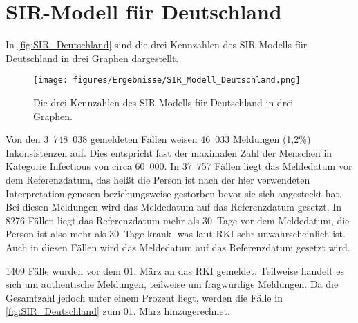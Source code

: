 \section{SIR-Modell für Deutschland}\label{sec:Resultate-SIR}
In \autoref{fig:SIR_Deutschland} sind die drei Kennzahlen des SIR-Modells für Deutschland in drei Graphen dargestellt.
\begin{figure}[H]
    \centering
    \texttt{[image: figures/Ergebnisse/SIR\_Modell\_Deutschland.png]}
    \caption{Die drei Kennzahlen des SIR-Modells für Deutschland in drei Graphen.}
    \label{fig:SIR_Deutschland}
\end{figure}

Von den 3~748~038 gemeldeten Fällen weisen 46~033 Meldungen (1,2\%) Inkonsistenzen auf. Dies entspricht fast der maximalen Zahl der Menschen in Kategorie \glqq{}Infectious\grqq{} von circa 60~000.
In 37~757 Fällen liegt das Meldedatum vor dem Referenzdatum, das heißt die Person ist nach der hier verwendeten Interpretation genesen beziehungsweise gestorben bevor sie sich angesteckt hat. Bei diesen Meldungen wird das Meldedatum auf das Referenzdatum gesetzt.
In 8276 Fällen liegt das Referenzdatum mehr als 30~Tage vor dem Meldedatum, die Person ist also mehr als 30~Tage krank, was laut RKI sehr unwahrscheinlich ist.\autocite{RKI_Bulletin} Auch in diesen Fällen wird das Meldedatum auf das Referenzdatum gesetzt wird.

1409 Fälle wurden vor dem 01. März an das RKI gemeldet. Teilweise handelt es sich um authentische Meldungen, teilweise um fragwürdige Meldungen. Da die Gesamtzahl jedoch unter einem Prozent liegt, werden die Fälle in \autoref{fig:SIR_Deutschland} zum 01. März hinzugerechnet.